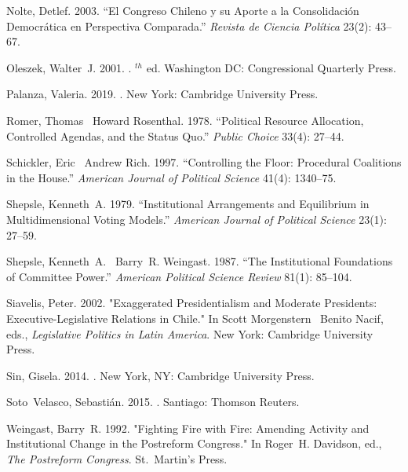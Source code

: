 \documentclass[letter,12pt]{article}
\begin{document}
\begin{thebibliography}{xx}
Nolte, Detlef. 2003.
\newblock ``El Congreso Chileno y su Aporte a la Consolidaci\'on Democr\'atica
  en Perspectiva Comparada.'' {\em Revista de Ciencia Pol\'itica} 23(2): 43--67.

Oleszek, Walter~J. 2001.
.
$^{th}$ ed. Washington DC:  Congressional Quarterly Press.

Palanza, Valeria. 2019.
.
\newblock New York:  Cambridge University Press.

Romer, Thomas \harvardand\ Howard Rosenthal. 1978.
\newblock ``Political Resource Allocation, Controlled Agendas, and the Status
  Quo.'' {\em Public Choice} 33(4): 27--44.

Schickler, Eric \harvardand\ Andrew Rich. 1997.
\newblock ``Controlling the Floor: Procedural Coalitions in the {H}ouse.'' {\em
  American Journal of Political Science} 41(4): 1340--75.

Shepsle, Kenneth~A. 1979.
\newblock ``Institutional Arrangements and Equilibrium in Multidimensional
  Voting Models.'' {\em American Journal of Political Science} 23(1): 27--59.

Shepsle, Kenneth~A. \harvardand\ Barry~R. Weingast. 1987.
\newblock ``The Institutional Foundations of Committee Power.'' {\em American
  Political Science Review} 81(1): 85--104.

Siavelis, Peter. 2002.
\newblock "Exaggerated Presidentialism and Moderate Presidents:
  Executive-Legislative Relations in {Chile}." In Scott Morgenstern \harvardand\ Benito Nacif, eds., {\em Legislative Politics in Latin America}. 
\newblock New York:  Cambridge University Press.

Sin, Gisela. 2014.
.
\newblock New York, NY:  Cambridge University Press.

Soto~Velasco, Sebasti\'an. 2015.
.
\newblock Santiago:  Thomson Reuters.

Weingast, Barry~R. 1992.
\newblock "Fighting Fire with Fire: Amending Activity and Institutional Change
  in the Postreform Congress." In Roger~H. Davidson, ed., {\em The Postreform Congress}. 
\newblock St.\ Martin's Press.

\end{thebibliography}
\end{document}

